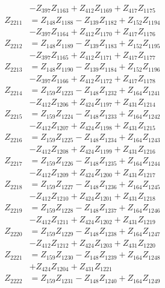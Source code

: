 \begin{multicols}{2}
\begin{align}
&- Z_{397}Z_{1163} + Z_{412}Z_{1169} + Z_{417}Z_{1175} \nonumber \\
Z_{2211} &= Z_{148}Z_{1188} - Z_{139}Z_{1182} + Z_{152}Z_{1194}  \nonumber \\
&- Z_{397}Z_{1164} + Z_{412}Z_{1170} + Z_{417}Z_{1176} \nonumber \\
Z_{2212} &= Z_{148}Z_{1189} - Z_{139}Z_{1183} + Z_{152}Z_{1195}  \nonumber \\
&- Z_{397}Z_{1165} + Z_{412}Z_{1171} + Z_{417}Z_{1177} \nonumber \\
Z_{2213} &= Z_{148}Z_{1190} - Z_{139}Z_{1184} + Z_{152}Z_{1196}  \nonumber \\
&- Z_{397}Z_{1166} + Z_{412}Z_{1172} + Z_{417}Z_{1178} \nonumber \\
Z_{2214} &= Z_{159}Z_{1223} - Z_{148}Z_{1232} + Z_{164}Z_{1241}  \nonumber \\
&- Z_{412}Z_{1206} + Z_{424}Z_{1197} + Z_{431}Z_{1214} \nonumber \\
Z_{2215} &= Z_{159}Z_{1224} - Z_{148}Z_{1233} + Z_{164}Z_{1242}  \nonumber \\
&- Z_{412}Z_{1207} + Z_{424}Z_{1198} + Z_{431}Z_{1215} \nonumber \\
Z_{2216} &= Z_{159}Z_{1225} - Z_{148}Z_{1234} + Z_{164}Z_{1243}  \nonumber \\
&- Z_{412}Z_{1208} + Z_{424}Z_{1199} + Z_{431}Z_{1216} \nonumber \\
Z_{2217} &= Z_{159}Z_{1226} - Z_{148}Z_{1235} + Z_{164}Z_{1244}  \nonumber \\
&- Z_{412}Z_{1209} + Z_{424}Z_{1200} + Z_{431}Z_{1217} \nonumber \\
Z_{2218} &= Z_{159}Z_{1227} - Z_{148}Z_{1236} + Z_{164}Z_{1245}  \nonumber \\
&- Z_{412}Z_{1210} + Z_{424}Z_{1201} + Z_{431}Z_{1218} \nonumber \\
Z_{2219} &= Z_{159}Z_{1228} - Z_{148}Z_{1237} + Z_{164}Z_{1246}  \nonumber \\
&- Z_{412}Z_{1211} + Z_{424}Z_{1202} + Z_{431}Z_{1219} \nonumber \\
Z_{2220} &= Z_{159}Z_{1229} - Z_{148}Z_{1238} + Z_{164}Z_{1247}  \nonumber \\
&- Z_{412}Z_{1212} + Z_{424}Z_{1203} + Z_{431}Z_{1220} \nonumber \\
Z_{2221} &= Z_{159}Z_{1230} - Z_{148}Z_{1239} + Z_{164}Z_{1248}  \nonumber \\
&+ Z_{424}Z_{1204} + Z_{431}Z_{1221} \nonumber \\
Z_{2222} &= Z_{159}Z_{1231} - Z_{148}Z_{1240} + Z_{164}Z_{1249}  \nonumber \\

\end{align}
\end{multicols}
